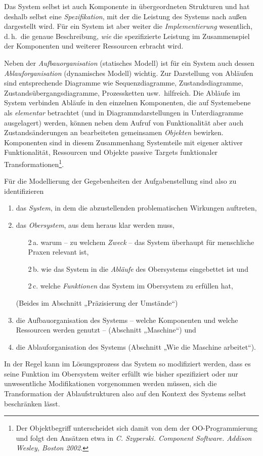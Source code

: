 \documentclass[11pt,a4paper]{article}
\begin{document}
Das System selbst ist auch Komponente in übergeordneten Strukturen und hat
deshalb selbst eine \emph{Spezifikation}, mit der die Leistung des Systems
nach außen dargestellt wird. Für ein System ist aber weiter die
\emph{Implementierung} wesentlich, d.\,h.\ die genaue Beschreibung, \emph{wie}
die spezifizierte Leistung im Zusammenspiel der Komponenten und weiterer
Ressourcen erbracht wird.

Neben der \emph{Aufbauorganisation} (statisches Modell) ist für ein System
auch dessen \emph{Ablauforganisation} (dynamisches Modell) wichtig. Zur
Darstellung von Abläufen sind entsprechende Diagramme wie Sequenzdiagramme,
Zustandsdiagramme, Zustandsübergangsdiagramme, Prozessketten
usw.\ hilfreich. Die Abläufe im System verbinden Abläufe in den einzelnen
Komponenten, die auf Systemebene als \emph{elementar} betrachtet (und in
Diagrammdarstellungen in Unterdiagramme ausgelagert) werden, können neben dem
Aufruf von Funktionalität aber auch Zustandsänderungen an bearbeiteten
gemeinsamen \emph{Objekten} bewirken.  Komponenten sind in diesem Zusammenhang
Systemteile mit eigener aktiver Funktionalität, Ressourcen und Objekte passive
Targets funktionaler Transformationen\footnote{Der Objektbegriff unterscheidet
  sich damit von dem der OO-Programmierung und folgt den Ansätzen etwa in
  \emph{C. Szyperski.  Component Software. Addison Wesley, Boston 2002.}}.

Für die Modellierung der Gegebenheiten der Aufgabenstellung sind also zu
identifizieren 
\begin{enumerate}
\item das \emph{System}, in dem die abzustellenden problematischen Wirkungen
  auftreten,
\item das \emph{Obersystem}, aus dem heraus klar werden muss,
\begin{enumerate}
\item [2\,a.] warum -- zu welchem \emph{Zweck} -- das System überhaupt für
  menschliche Praxen relevant ist,
\item [2\,b.] wie das System in die \emph{Abläufe} des Obersystems eingebettet
  ist und
\item [2\,c.] welche \emph{Funktionen} das System im Obersystem zu erfüllen
  hat,
\end{enumerate}
(Beides im Abschnitt „Präzisierung der Umstände“)
\item die Aufbauorganisation des Systems -- welche Komponenten und welche
  Ressourcen werden genutzt -- (Abschnitt „Maschine“) und
\item die Ablauforganisation des Systems (Abschnitt „Wie die Maschine
  arbeitet“).
\end{enumerate}
In der Regel kann im Lösungsprozess das System so modifiziert werden, dass es
seine Funktion im Obersystem weiter erfüllt wie bisher spezifiziert oder nur
unwesentliche Modifikationen vorgenommen werden müssen, sich die
Transformation der Ablaufstrukturen also auf den Kontext des Systems selbst
beschränken lässt.
\end{document}
